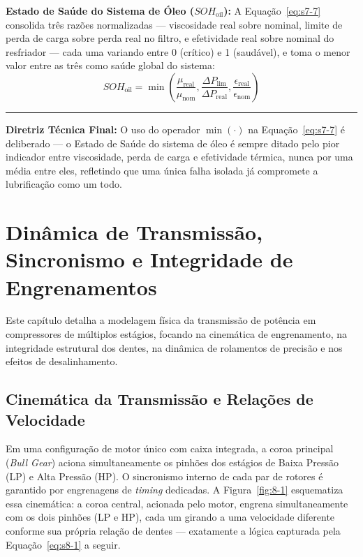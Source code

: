 \documentclass[12pt,a4paper]{article}
\numberwithin{equation}{section}
\numberwithin{table}{section}
\numberwithin{figure}{section}
\begin{document}
	\vspace{1em}
	\textbf{Estado de Saúde do Sistema de Óleo ($SOH_{\text{oil}}$):} A Equação~\eqref{eq:s7-7} consolida três razões normalizadas — viscosidade real sobre nominal, limite de perda de carga sobre perda real no filtro, e efetividade real sobre nominal do resfriador — cada uma variando entre 0 (crítico) e 1 (saudável), e toma o menor valor entre as três como saúde global do sistema:
	\begin{equation}\label{eq:s7-7}
 \boxed{SOH_{\text{oil}} = \min \left( \frac{\mu_{\text{real}}}{\mu_{\text{nom}}}, \frac{\Delta P_{\text{lim}}}{\Delta P_{\text{real}}}, \frac{\epsilon_{\text{real}}}{\epsilon_{\text{nom}}} \right)}
\end{equation}

	\vspace{1em}
	\hrule
	\vspace{1em}

	\textbf{Diretriz Técnica Final:} O uso do operador $\min(\cdot)$ na Equação~\eqref{eq:s7-7} é deliberado — o Estado de Saúde do sistema de óleo é sempre ditado pelo pior indicador entre viscosidade, perda de carga e efetividade térmica, nunca por uma média entre eles, refletindo que uma única falha isolada já compromete a lubrificação como um todo.

	
	
	\section{\textbf{Dinâmica de Transmissão, Sincronismo e Integridade de Engrenamentos}}
	
	Este capítulo detalha a modelagem física da transmissão de potência em compressores de múltiplos estágios, focando na cinemática de engrenamento, na integridade estrutural dos dentes, na dinâmica de rolamentos de precisão e nos efeitos de desalinhamento.
	
	\subsection{\textbf{Cinemática da Transmissão e Relações de Velocidade}}
	Em uma configuração de motor único com caixa integrada, a coroa principal (\textit{Bull Gear}) aciona simultaneamente os pinhões dos estágios de Baixa Pressão (LP) e Alta Pressão (HP). O sincronismo interno de cada par de rotores é garantido por engrenagens de \textit{timing} dedicadas. A Figura~\ref{fig:8-1} esquematiza essa cinemática: a coroa central, acionada pelo motor, engrena simultaneamente com os dois pinhões (LP e HP), cada um girando a uma velocidade diferente conforme sua própria relação de dentes — exatamente a lógica capturada pela Equação~\eqref{eq:s8-1} a seguir.
\end{document}
